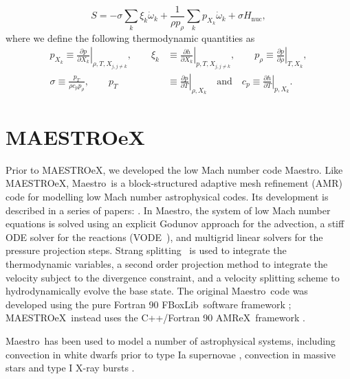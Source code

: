 \documentclass[a4paper]{jpconf}
\newcommand{\maestro}{{\sffamily Maestro}}
\newcommand{\maestroex}{{\sffamily MAESTROeX}}
\newcommand{\amrex}{{\sffamily AMReX}}
\newcommand{\fboxlib}{{\sffamily FBoxLib}}
\newcommand{\pd}[2]{\frac{\partial #1}{\partial #2}}
\begin{document}
\begin{equation}
    S = -\sigma \sum_k \xi_k\dot{\omega}_k + \frac{1}{\rho p_\rho}\sum_k p_{X_k}\dot{\omega}_k + \sigma H_{\mathrm{nuc}},
\end{equation}
where we define the following thermodynamic quantities as
\begin{align*}
    p_{X_k} \equiv \left.\pd{p}{X_k}\right|_{\rho,T,X_{j,j\neq k}},\qquad
     \xi_k&\equiv \left.\pd{h}{X_k}\right|_{p, T,X_{j,j\neq k}},\qquad
     p_\rho\equiv \left.\pd{p}{\rho}\right|_{T, X_k},\\
     \sigma \equiv \frac{p_T}{\rho c_p p_\rho}, \qquad
     p_T&\equiv \left.\pd{p}{T}\right|_{\rho, X_k} \quad\mathrm{and}\quad 
     c_p\equiv \left.\pd{h}{T}\right|_{p, X_k}.
\end{align*}


\section{MAESTROeX} \label{sec:maestroex}



Prior to \maestroex, we developed the low Mach number code \maestro. Like \maestroex, \maestro~is a block-structured adaptive mesh refinement (AMR) code for modelling low Mach number astrophysical codes. Its development is described in a series of papers: \cite{Almgren2006a,Almgren2006b,Almgren2008a,Zingale2009,Nonaka2010}. In \maestro, the system of low Mach number equations is solved using an explicit Godunov approach for the advection, a stiff ODE solver for the reactions (VODE~\cite{vode}), and multigrid linear solvers for the pressure projection steps. Strang splitting~\cite{strang:1968} is used to integrate the thermodynamic variables, a second order projection method to integrate the velocity subject to the divergence constraint, and a velocity splitting scheme to hydrodynamically evolve the base state. The original \maestro~code was developed using the pure Fortran 90 \fboxlib~software framework \cite{Zhang2016}; \maestroex~instead uses the C++/Fortran 90 \amrex~framework \cite{Zhang2019}. 

\maestro~has been used to model a number of astrophysical systems, including convection in white dwarfs prior to type Ia supernovae \cite{Zingale2011,Nonaka2011,Malone2014a,Zingale2013,Jacobs2016}, convection in massive stars \cite{Gilet2013} and type I X-ray bursts \cite{Malone2011,Malone2014,Zingale2015}. 
\end{document}
